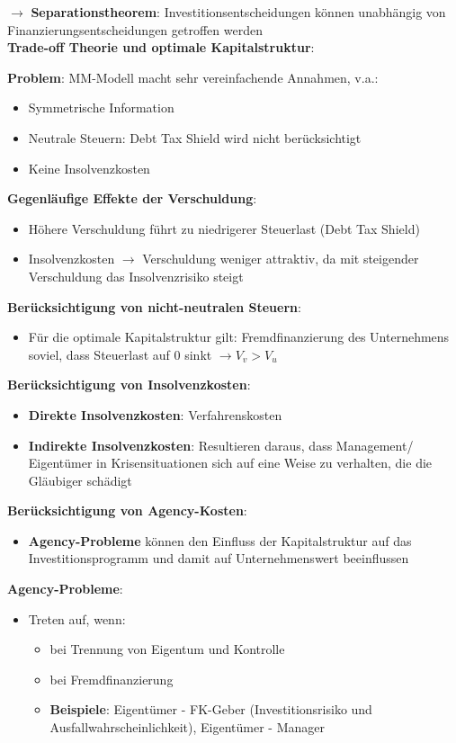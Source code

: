 $\rightarrow$ \textbf{Separationstheorem}: Investitionsentscheidungen können unabhängig von Finanzierungsentscheidungen getroffen werden\\

\textbf{Trade-off Theorie und optimale Kapitalstruktur}:

\textbf{Problem}: MM-Modell macht sehr vereinfachende Annahmen, v.a.:
\begin{itemize}
	\item Symmetrische Information
	\item Neutrale Steuern: Debt Tax Shield wird nicht berücksichtigt
	\item Keine Insolvenzkosten
\end{itemize}

\textbf{Gegenläufige Effekte der Verschuldung}:
\begin{itemize}
	\item Höhere Verschuldung führt zu niedrigerer Steuerlast (Debt Tax Shield)
	\item Insolvenzkosten $\rightarrow$ Verschuldung weniger attraktiv, da mit steigender Verschuldung das Insolvenzrisiko steigt
\end{itemize}

\textbf{Berücksichtigung von nicht-neutralen Steuern}:
\begin{itemize}
	\item Für die optimale Kapitalstruktur gilt: Fremdfinanzierung des Unternehmens soviel, dass Steuerlast auf 0 sinkt $\rightarrow V_v>V_u$
\end{itemize}

\textbf{Berücksichtigung von Insolvenzkosten}:
\begin{itemize}
	\item \textbf{Direkte Insolvenzkosten}: Verfahrenskosten
	\item \textbf{Indirekte Insolvenzkosten}: Resultieren daraus, dass Management/ Eigentümer in Krisensituationen sich auf eine Weise zu verhalten, die die Gläubiger schädigt
\end{itemize}

\textbf{Berücksichtigung von Agency-Kosten}: 
\begin{itemize}
	\item \textbf{Agency-Probleme} können den Einfluss der Kapitalstruktur auf das Investitionsprogramm und damit auf Unternehmenswert beeinflussen
\end{itemize}

\textbf{Agency-Probleme}:
\begin{itemize}
	\item Treten auf, wenn:
	\begin{itemize}
		\item bei Trennung von Eigentum und Kontrolle
		\item bei Fremdfinanzierung
		\item \textbf{Beispiele}: Eigentümer - FK-Geber (Investitionsrisiko und Ausfallwahrscheinlichkeit), Eigentümer - Manager
	\end{itemize}
\end{itemize}

